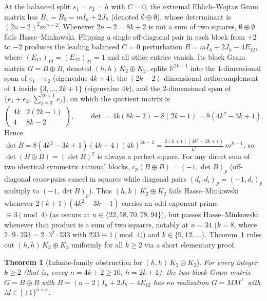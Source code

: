\documentclass[11pt]{article}
\newtheorem{theorem}{Theorem}
\theoremstyle{remark}
\newcommand{\R}{\mathbb{R}}
\begin{document}
At the balanced split $s_1 = s_2 = h$ with $C = 0$, the extremal Ehlich--Wojtas Gram matrix has $B_1 = B_2 = m I_h + 2 J_h$ (denoted $\emptyset \oplus \emptyset$), whose determinant is $(2n - 2)^2 m^{n-2}$. Whenever $2n - 2 = 8k + 2$ is not a sum of two squares, $\emptyset \oplus \emptyset$ fails Hasse--Minkowski. Flipping a single off-diagonal pair in each block from $+2$ to $-2$ produces the leading balanced $C = 0$ perturbation $B = m I_h + 2 J_h - 4 E_{12}$, where $(E_{12})_{12} = (E_{12})_{21} = 1$ and all other entries vanish. Its block Gram matrix $G = B \oplus B$, denoted $(h, h)\, K_2 \oplus K_2$, splits $\R^{2k+1}$ into the $1$-dimensional span of $e_1 - e_2$ (eigenvalue $4k + 4$), the $(2k-2)$-dimensional orthocomplement of $\mathbf{1}$ inside $\{3, \dots, 2k+1\}$ (eigenvalue $4k$), and the $2$-dimensional span of $\{e_1 + e_2, \sum_{j=3}^{2k+1} e_j\}$, on which the quotient matrix is
\[
  \begin{pmatrix} 4k & 2(2k-1) \\ 4 & 8k - 2 \end{pmatrix},
  \qquad \det = 4k(8k - 2) - 8(2k - 1) = 8(4k^2 - 3k + 1).
\]
Hence $\det B = 8(4k^2 - 3k + 1)(4k + 4)(4k)^{2k-2} = \frac{2(k + 1)(4k^2 - 3k + 1)}{k^2}\, m^{h-1}$, so $\det(B \oplus B) = (\det B)^2$ is always a perfect square. For any direct sum of two identical symmetric rational blocks, $c_p(B \oplus B) = (-1, \det B)_p$ (off-diagonal cross-pairs cancel in squares while diagonal pairs $(d_i, d_i)_p = (-1, d_i)_p$ multiply to $(-1, \det B)_p$). Thus $(h, h)\, K_2 \oplus K_2$ fails Hasse--Minkowski whenever $2(k + 1)(4k^2 - 3k + 1)$ carries an odd-exponent prime $\equiv 3 \pmod 4$ (as occurs at $n \in \{22, 58, 70, 78, 94\}$), but passes Hasse--Minkowski whenever that product is a sum of two squares, notably at $n = 34$ ($k = 8$, where $2 \cdot 9 \cdot 233 = 2 \cdot 3^2 \cdot 233$ with $233 \equiv 1 \pmod 4$) and $k \in \{9, 12, \dots\}$. Theorem~\ref{thm:k2k2} rules out $(h, h)\, K_2 \oplus K_2$ uniformly for all $k \ge 2$ via a short elementary proof.

\begin{theorem}[Infinite-family obstruction for $(h, h)\, K_2 \oplus K_2$]\label{thm:k2k2}
For every integer $k \ge 2$ (that is, every $n = 4k + 2 \ge 10$, $h = 2k + 1$), the two-block Gram matrix $G = B \oplus B$ with $B = (n - 2) I_h + 2 J_h - 4 E_{12}$ has no realization $G = M M^\top$ with $M \in \{\pm 1\}^{n \times n}$.
\end{theorem}
\end{document}
